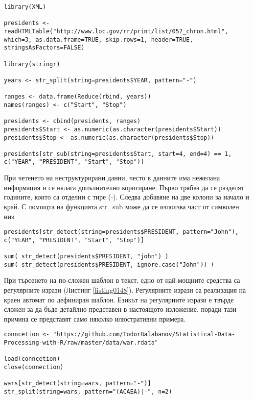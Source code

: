 \begin{lstlisting}[caption=Извличане на текст, label=listing0147]
library(XML)

presidents <- readHTMLTable("http://www.loc.gov/rr/print/list/057_chron.html", which=3, as.data.frame=TRUE, skip.rows=1, header=TRUE, stringsAsFactors=FALSE)

library(stringr)

years <- str_split(string=presidents$YEAR, pattern="-")

ranges <- data.frame(Reduce(rbind, years))
names(ranges) <- c("Start", "Stop")

presidents <- cbind(presidents, ranges)
presidents$Start <- as.numeric(as.character(presidents$Start))
presidents$Stop <- as.numeric(as.character(presidents$Stop))

presidents[str_sub(string=presidents$Start, start=4, end=4) == 1, c("YEAR", "PRESIDENT", "Start", "Stop")]
\end{lstlisting}

При четенето на неструктурирани данни, често в данните има нежелана информация и се налага допълнително коригиране. Първо трябва да се разделят годините, които са отделни с тире (-). Следва добавяне на две колони за начало и край. С помощта на функцията str\_sub може да се използва част от символен низ.

\begin{lstlisting}[caption=Регулярни изрази, label=listing0148]
presidents[str_detect(string=presidents$PRESIDENT, pattern="John"), c("YEAR", "PRESIDENT", "Start", "Stop")]

sum( str_detect(presidents$PRESIDENT, "john") )
sum( str_detect(presidents$PRESIDENT, ignore.case("John")) )
\end{lstlisting}

При търсенето на по-сложен шаблон в текст, едно от най-мощните средства са регулярните изрази (Листинг \ref{listing0148}). Регулярните изрази са реализация на краен автомат по дефиниран шаблон. Езикът на регулярните изрази е твърде сложен за да бъде детайлно представен в настоящото изложение, поради тази причина се представят само няколко илюстративни примера.

\begin{lstlisting}[caption=Сложни регулярни изрази, label=listing0149]
conncetion <- "https://github.com/TodorBalabanov/Statistical-Data-Processing-with-R/raw/master/data/war.rdata"

load(conncetion)
close(connection)

wars[str_detect(string=wars, pattern="-")]
str_split(string=wars, pattern="(ACAEA)|-", n=2)
\end{lstlisting}

